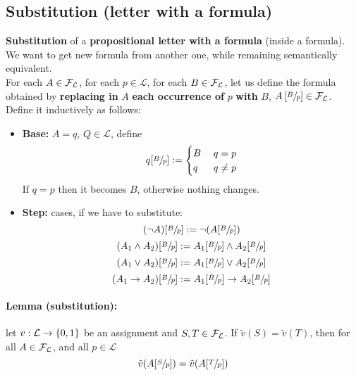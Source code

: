\documentclass[11pt]{article}
\begin{document}
	\subsection{Substitution (letter with a formula)}
	
	\textbf{Substitution} of a \textbf{propositional letter with a formula} (inside a formula). We want to get new formula from another one, while remaining semantically equivalent.\\
		
	
	For each $A \in \mathcal{F}_\mathcal{L}$, for each $p \in \mathcal{L}$, for each $B \in \mathcal{F}_\mathcal{L}$, let us define the formula obtained by \textbf{replacing in} $A$ \textbf{each occurrence of} $p$ \textbf{with} $B$, $A\left[\sfrac{B}{p}\right] \in \mathcal{F}_\mathcal{L}$. Define it inductively as follows:
	\begin{itemize}
		\item \textbf{Base:} $A = q$, $Q \in \mathcal{L}$, define 
		$$q[\sfrac{B}{p}] := \begin{cases}
			B \; & q = p  \\
			q \;  & q \neq p
		\end{cases}
		$$
		If $q=p$ then it becomes $B$, otherwise nothing changes.
		
		\item \textbf{Step:} cases, if we have to substitute:
		$$ (\neg A)[\sfrac{B}{p}] := \neg(A[\sfrac{B}{p}]) $$
		$$ (A_1 \wedge A_2) [\sfrac{B}{p}] := A_1 [\sfrac{B}{p}] \wedge A_2 [\sfrac{B}{p}] $$
		$$ (A_1 \vee A_2) [\sfrac{B}{p}] := A_1 [\sfrac{B}{p}] \vee A_2 [\sfrac{B}{p}] $$
		$$ (A_1 \rightarrow A_2) [\sfrac{B}{p}] := A_1 [\sfrac{B}{p}] \rightarrow A_2 [\sfrac{B}{p}] $$
	\end{itemize}
	
	\newpage
	
	\paragraph{Lemma (substitution):} let $v: \mathcal{L} \rightarrow \{0,1\}$ be an assignment and $S,T \in \mathcal{F}_\mathcal{L}$. If $\tilde{v}(S) = \tilde{v} (T)$, then for all $A \in \mathcal{F}_\mathcal{L}$, and all $p \in \mathcal{L}$
	$$ \tilde{v} (A [\sfrac{S}{p}]) = \tilde{v} (A[\sfrac{T}{p}]) $$
	
\end{document}
